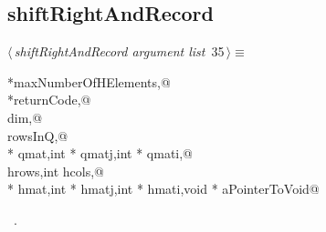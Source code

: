 \documentclass{article}
\begin{document}
\subsection{shiftRightAndRecord}
\label{sec:shiftRightAndRecord}
\begin{flushleft} \small
\begin{minipage}{\linewidth}\label{scrap42}\raggedright\small
{} $\langle\,${\itshape shiftRightAndRecord argument list}\nobreak\ {\footnotesize {35}}$\,\rangle\equiv$
\vspace{-1ex}
\begin{list}{}{} \item
\mbox{}\verb@int *maxNumberOfHElements,@\\
\mbox{}\verb@int *returnCode,@\\
\mbox{}\verb@int dim,@\\
\mbox{}\verb@int rowsInQ,@\\
\mbox{}\verb@double * qmat,int * qmatj,int * qmati,@\\
\mbox{}\verb@int hrows,int hcols,@\\
\mbox{}\verb@double * hmat,int * hmatj,int * hmati,void * aPointerToVoid@\\
\mbox{}\verb@@{\NWsep}
\end{list}
\vspace{-1.5ex}
\footnotesize
\begin{list}{}{\setlength{\itemsep}{-\parsep}\setlength{\itemindent}{-\leftmargin}}
\item \NWtxtMacroRefIn\ .

\end{list}
\end{minipage}
\end{flushleft}
\end{document}
